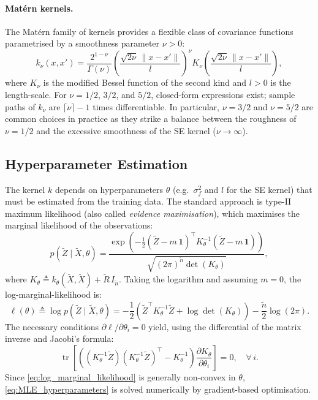 \paragraph{Mat\'{e}rn kernels.}
The Mat\'{e}rn family of kernels provides a flexible class of covariance
functions parametrised by a smoothness parameter $\nu > 0$:
\begin{equation}
    k_{\nu}(x, x') = \frac{2^{1-\nu}}{\Gamma(\nu)}
    \left(\frac{\sqrt{2\nu}\,\|x - x'\|}{l}\right)^\nu
    K_\nu\!\left(\frac{\sqrt{2\nu}\,\|x - x'\|}{l}\right),
    \label{eq:Matern_kernel}
\end{equation}
where $K_\nu$ is the modified Bessel function of the second kind and $l > 0$
is the length-scale. For $\nu = 1/2$, $3/2$, and $5/2$, closed-form
expressions exist; sample paths of $k_\nu$ are $\lceil\nu\rceil - 1$ times
differentiable. In particular, $\nu = 3/2$ and $\nu = 5/2$ are common choices
in practice as they strike a balance between the roughness of $\nu = 1/2$ and
the excessive smoothness of the SE kernel ($\nu \to \infty$).

\subsection{Hyperparameter Estimation}
\label{sec:hyperparameters}

The kernel $k$ depends on hyperparameters $\theta$ (e.g.\ $\sigma_f^2$ and $l$
for the SE kernel) that must be estimated from the training data. The standard
approach is type-II maximum likelihood (also called \emph{evidence maximisation}),
which maximises the marginal likelihood of the observations:
\begin{equation}
    p(\tilde{Z} \mid \tilde{X}, \theta)
    = \frac{\exp\!\left(-\frac{1}{2}
      (\tilde{Z} - m\,\mathbf{1})^\top K_\theta^{-1}
      (\tilde{Z} - m\,\mathbf{1})\right)}
      {\sqrt{(2\pi)^{\tilde{n}}\det(K_\theta)}},
    \label{eq:marginal_likelihood}
\end{equation}
where $K_\theta \triangleq k_\theta(\tilde{X}, \tilde{X}) + \tilde{R}\,
I_{\tilde{n}}$. Taking the logarithm and assuming $m = 0$, the
log-marginal-likelihood is:
\begin{equation}
    \ell(\theta) \triangleq \log p(\tilde{Z} \mid \tilde{X}, \theta)
    = -\frac{1}{2}\left(
      \tilde{Z}^\top K_\theta^{-1} \tilde{Z}
      + \log\det(K_\theta)
    \right) - \frac{\tilde{n}}{2}\log(2\pi).
    \label{eq:log_marginal_likelihood}
\end{equation}
The necessary conditions $\partial\ell/\partial\theta_i = 0$ yield, using the
differential of the matrix inverse and Jacobi's formula:
\begin{equation}
    \operatorname{tr}\!\left[\left(
    (K_\theta^{-1}\tilde{Z})(K_\theta^{-1}\tilde{Z})^\top - K_\theta^{-1}
    \right)\frac{\partial K_\theta}{\partial\theta_i}\right] = 0,
    \quad \forall\,i.
    \label{eq:MLE_hyperparameters}
\end{equation}
Since \eqref{eq:log_marginal_likelihood} is generally non-convex in $\theta$,
\eqref{eq:MLE_hyperparameters} is solved numerically by gradient-based
optimisation.


